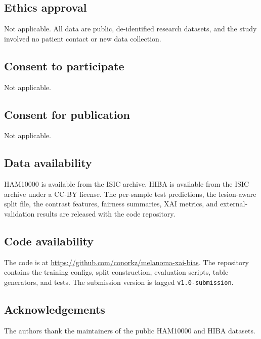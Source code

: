 \documentclass[11pt]{article}
\begin{document}
\subsection*{Ethics approval}
Not applicable. All data are public, de-identified research datasets, and the study involved no patient contact or new data collection.

\subsection*{Consent to participate}
Not applicable.

\subsection*{Consent for publication}
Not applicable.

\subsection*{Data availability}
HAM10000 is available from the ISIC archive. HIBA is available from the ISIC archive under a CC-BY license. The per-sample test predictions, the lesion-aware split file, the contrast features, fairness summaries, XAI metrics, and external-validation results are released with the code repository.

\subsection*{Code availability}
The code is at \url{https://github.com/conorkz/melanoma-xai-bias}. The repository contains the training configs, split construction, evaluation scripts, table generators, and tests. The submission version is tagged \texttt{v1.0-submission}.

\subsection*{Acknowledgements}
The authors thank the maintainers of the public HAM10000 and HIBA datasets.
\end{document}
